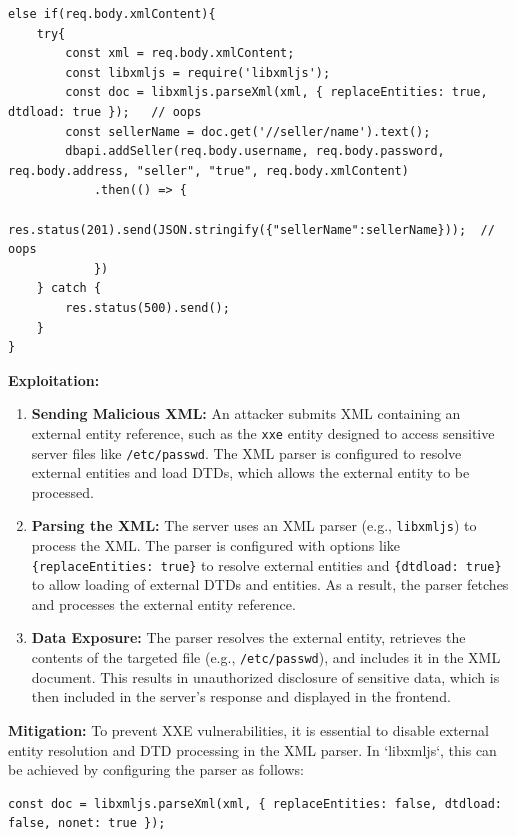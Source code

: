 \documentclass[]{article}
\begin{document}
\begin{lstlisting}
else if(req.body.xmlContent){
    try{
        const xml = req.body.xmlContent;
        const libxmljs = require('libxmljs');
        const doc = libxmljs.parseXml(xml, { replaceEntities: true, dtdload: true });   // oops
        const sellerName = doc.get('//seller/name').text();
        dbapi.addSeller(req.body.username, req.body.password, req.body.address, "seller", "true", req.body.xmlContent)
            .then(() => {
                res.status(201).send(JSON.stringify({"sellerName":sellerName}));  // oops
            })
    } catch {
        res.status(500).send();
    }
}
\end{lstlisting}
\textbf{Exploitation:}

\begin{enumerate}
    \item \textbf{Sending Malicious XML:} An attacker submits XML containing an external entity reference, such as the \texttt{xxe} entity designed to access sensitive server files like \texttt{/etc/passwd}. The XML parser is configured to resolve external entities and load DTDs, which allows the external entity to be processed.

    \item \textbf{Parsing the XML:} The server uses an XML parser (e.g., \texttt{libxmljs}) to process the XML. The parser is configured with options like \texttt{\{replaceEntities: true\}} to resolve external entities and \texttt{\{dtdload: true\}} to allow loading of external DTDs and entities. As a result, the parser fetches and processes the external entity reference.

    \item \textbf{Data Exposure:} The parser resolves the external entity, retrieves the contents of the targeted file (e.g., \texttt{/etc/passwd}), and includes it in the XML document. This results in unauthorized disclosure of sensitive data, which is then included in the server's response and displayed in the frontend.
\end{enumerate}
\textbf{Mitigation:}
To prevent XXE vulnerabilities, it is essential to disable external entity resolution and DTD processing in the XML parser. In `libxmljs`, this can be achieved by configuring the parser as follows:

\begin{lstlisting}
const doc = libxmljs.parseXml(xml, { replaceEntities: false, dtdload: false, nonet: true });
\end{lstlisting}
\end{document}
